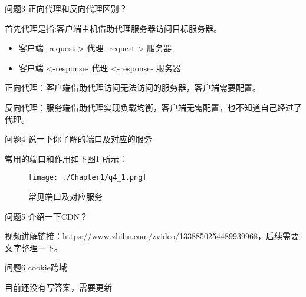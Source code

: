 \documentclass[cn,11pt,color=blue]{elegantbook}
\begin{document}
\begin{custom}{问题3}
正向代理和反向代理区别？
\end{custom}
\begin{solution}
首先代理是指:客户端主机借助代理服务器访问目标服务器。
\begin{itemize}
\item 客户端 -request-> 代理 -request-> 服务器
\item 客户端 <-response- 代理 <-response- 服务器
\end{itemize}

正向代理：客户端借助代理访问无法访问的服务器，客户端需要配置。

反向代理：服务端借助代理实现负载均衡，客户端无需配置，也不知道自己经过了代理。
\end{solution}

\begin{custom}{问题4}
说一下你了解的端口及对应的服务
\end{custom}
\begin{solution}
常用的端口和作用如下图\ref{fig4_1} 所示：
\begin{figure}[htbp]
\centering
\texttt{[image: ./Chapter1/q4\_1.png]}
\caption{常见端口及对应服务}
\label{fig4_1}
\end{figure}

\end{solution}

\begin{custom}{问题5}
介绍一下CDN？
\end{custom}
\begin{solution}
视频讲解链接：\href{https://www.zhihu.com/zvideo/1338850254489939968}{https://www.zhihu.com/zvideo/1338850254489939968}，后续需要文字整理一下。
\end{solution}

\begin{custom}{问题6}
cookie跨域
\end{custom}
\begin{solution}
目前还没有写答案，需要更新
\end{solution}
\end{document}
